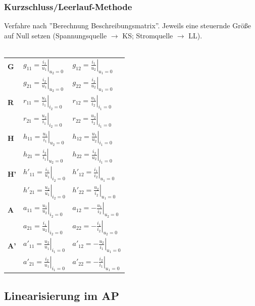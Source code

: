 \documentclass[a4paper,twocolumn,10pt]{article}
\begin{document}
\subsubsection*{Kurzschluss/Leerlauf-Methode}
Verfahre nach ''Berechnung Beschreibungsmatrix''. 
Jeweils eine steuernde Größe auf Null setzen (Spannungsquelle $\rightarrow$ KS; Stromquelle $\rightarrow$ LL).\\\\
\begin{tabular}{lll}
	\textbf{G} & $g_{11}=\left.\frac{i_1}{u_1}\right|_{u_2=0}$ & $g_{12}=\left.\frac{i_1}{u_2}\right|_{u_1=0}$\\
	& $g_{21}=\left.\frac{i_2}{u_1}\right|_{u_2=0}$ & $g_{22}=\left.\frac{i_2}{u_2}\right|_{u_1=0}$\\
	\textbf{R} & $r_{11}=\left.\frac{u_1}{i_1}\right|_{i_2=0}$ & $r_{12}=\left.\frac{u_1}{i_2}\right|_{i_1=0}$\\
	& $r_{21}=\left.\frac{u_2}{i_1}\right|_{i_2=0}$ & $r_{22}=\left.\frac{u_2}{i_2}\right|_{i_1=0}$\\
	\textbf{H} & $h_{11}=\left.\frac{u_1}{i_1}\right|_{u_2=0}$ & $h_{12}=\left.\frac{u_1}{u_2}\right|_{i_1=0}$\\
	& $h_{21}=\left.\frac{i_2}{i_1}\right|_{u_2=0}$ & $h_{22}=\left.\frac{i_2}{u_2}\right|_{i_1=0}$\\
	\textbf{H'} & $h'_{11}=\left.\frac{i_1}{u_1}\right|_{i_2=0}$ & $h'_{12}=\left.\frac{i_1}{i_2}\right|_{u_1=0}$\\
	& $h'_{21}=\left.\frac{u_2}{u_1}\right|_{i_2=0}$ & $h'_{22}=\left.\frac{u_2}{i_2}\right|_{u_1=0}$\\
	\textbf{A} & $a_{11}=\left.\frac{u_1}{u_2}\right|_{i_2=0}$ & $a_{12}=\left.-\frac{u_1}{i_2}\right|_{u_2=0}$\\
	& $a_{21}=\left.\frac{i_1}{u_2}\right|_{i_2=0}$ & $a_{22}=\left.-\frac{i_1}{i_2}\right|_{u_2=0}$\\
	\textbf{A'} & $a'_{11}=\left.\frac{u_2}{u_1}\right|_{i_1=0}$ & $a'_{12}=\left.-\frac{u_2}{i_1}\right|_{u_1=0}$\\
	& $a'_{21}=\left.\frac{i_2}{u_1}\right|_{i_1=0}$ & $a'_{22}=\left.-\frac{i_2}{i_1}\right|_{u_1=0}$
\end{tabular}



\subsection*{Linearisierung im AP}
\end{document}
